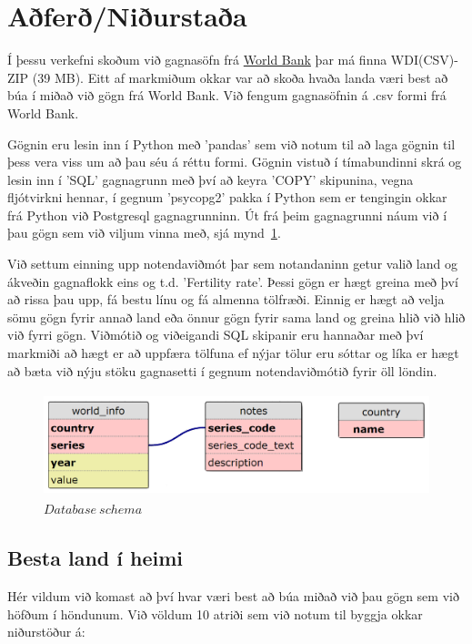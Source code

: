\documentclass[paper=a4, fontsize=11pt]{scrartcl}
\begin{document}


\section{Aðferð/Niðurstaða}
Í þessu verkefni skoðum við gagnasöfn frá \href{http://data.worldbank.org/data-catalog/world-development-indicators}{World Bank} þar má finna WDI(CSV)-ZIP (39 MB). Eitt af markmiðum okkar var að skoða hvaða landa væri best að búa í miðað við gögn frá World Bank. Við fengum gagnasöfnin á .csv formi frá World Bank.\par Gögnin eru lesin inn í Python með 'pandas' sem við notum til að laga gögnin til þess vera viss um að þau séu á réttu formi. Gögnin vistuð í tímabundinni skrá og lesin inn í 'SQL' gagnagrunn með því að keyra 'COPY' skipunina, vegna fljótvirkni hennar, í gegnum 'psycopg2' pakka í Python sem er tengingin okkar frá Python við Postgresql gagnagrunninn. Út frá þeim gagnagrunni náum við í þau gögn sem við viljum vinna með, sjá mynd~\ref{fig:skema}.
\par Við settum einning upp notendaviðmót þar sem notandaninn getur valið land og ákveðin gagnaflokk eins og t.d. 'Fertility rate'. Þessi gögn er hægt greina með því að rissa þau upp, fá bestu línu og fá almenna tölfræði. Einnig er hægt að velja sömu gögn fyrir annað land eða önnur gögn fyrir sama land og greina hlið við hlið við fyrri gögn. Viðmótið og viðeigandi SQL skipanir eru hannaðar með því markmiði að hægt er að uppfæra tölfuna ef nýjar tölur eru sóttar og líka er hægt að bæta við nýju stöku gagnasetti í gegnum notendaviðmótið fyrir öll löndin.\\
\vspace{40mm}
\begin{figure}[H]
\begin{center}
\includegraphics[height=30mm]{images/schema.png}
\caption{$ Database\ schema $\label{fig:skema}}
\end{center}
\end{figure}
\newpage
\subsection{Besta land í heimi}
Hér vildum við komast að því hvar væri best að búa miðað við þau gögn sem við höfðum í höndunum. Við völdum 10 atriði sem við notum til byggja okkar niðurstöður á:\\
\noindent
\end{document}
